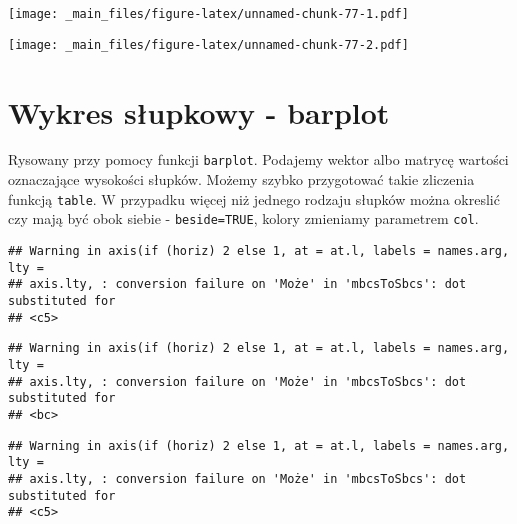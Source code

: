 \documentclass[
]{book}
\newenvironment{Shaded}{\begin{snugshade}}{\end{snugshade}}
\newcommand{\FunctionTok}[1]{\textcolor[rgb]{0.00,0.00,0.00}{#1}}
\newcommand{\NormalTok}[1]{#1}
\newcommand{\SpecialCharTok}[1]{\textcolor[rgb]{0.00,0.00,0.00}{#1}}
\begin{document}
\texttt{[image: \_main\_files/figure-latex/unnamed-chunk-77-1.pdf]}

\begin{Shaded}
\end{Shaded}

\texttt{[image: \_main\_files/figure-latex/unnamed-chunk-77-2.pdf]}

\hypertarget{wykres-sux142upkowy---barplot}{%
\section{Wykres słupkowy - barplot}\label{wykres-sux142upkowy---barplot}}

Rysowany przy pomocy funkcji \texttt{barplot}. Podajemy wektor albo matrycę wartości oznaczające wysokości słupków. Możemy szybko przygotować takie zliczenia funkcją \texttt{table}. W przypadku więcej niż jednego rodzaju słupków można okreslić czy mają być obok siebie - \texttt{beside=TRUE}, kolory zmieniamy parametrem \texttt{col}.

\begin{Shaded}
\end{Shaded}

\begin{verbatim}
## Warning in axis(if (horiz) 2 else 1, at = at.l, labels = names.arg, lty =
## axis.lty, : conversion failure on 'Może' in 'mbcsToSbcs': dot substituted for
## <c5>
\end{verbatim}

\begin{verbatim}
## Warning in axis(if (horiz) 2 else 1, at = at.l, labels = names.arg, lty =
## axis.lty, : conversion failure on 'Może' in 'mbcsToSbcs': dot substituted for
## <bc>
\end{verbatim}

\begin{verbatim}
## Warning in axis(if (horiz) 2 else 1, at = at.l, labels = names.arg, lty =
## axis.lty, : conversion failure on 'Może' in 'mbcsToSbcs': dot substituted for
## <c5>
\end{verbatim}
\end{document}
